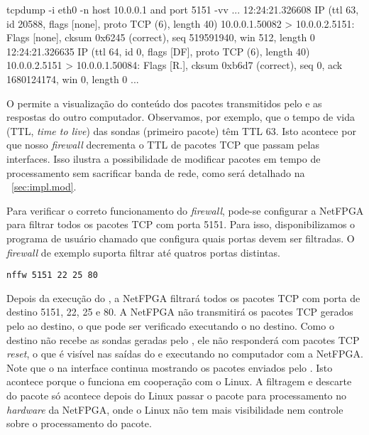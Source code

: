 \begin{verbnobox}[\small]
tcpdump -i eth0 -n host 10.0.0.1 and port 5151 -vv
...
12:24:21.326608 IP (ttl 63, id 20588, flags [none], proto TCP (6), length 40)
    10.0.0.1.50082 > 10.0.0.2.5151: Flags [none], cksum 0x6245 (correct),
                seq 519591940, win 512, length 0
12:24:21.326635 IP (ttl 64, id 0, flags [DF], proto TCP (6), length 40)
    10.0.0.2.5151 > 10.0.0.1.50084: Flags [R.], cksum 0xb6d7 (correct),
                seq 0, ack 1680124174, win 0, length 0
...
\end{verbnobox}

O  permite a visualização do conteúdo dos pacotes
transmitidos pelo  e as respostas do outro computador.
Observamos, por exemplo, que o tempo de vida (TTL, \emph{time to
live}) das sondas (primeiro pacote) têm TTL 63.  Isto acontece por
que nosso \emph{firewall} decrementa o TTL de pacotes TCP que passam
pelas interfaces. Isso ilustra a possibilidade de modificar pacotes
em tempo de processamento sem sacrificar banda de rede, como será
detalhado na \secstr~\ref{sec:impl.mod}.

Para verificar o correto funcionamento do \emph{firewall}, pode-se
configurar a NetFPGA para filtrar todos os pacotes TCP com porta
5151.  Para isso, disponibilizamos o programa de usuário chamado
 que configura quais portas devem ser filtradas. O
\emph{firewall} de exemplo suporta filtrar até quatros portas
distintas.

\begin{verbatim}
nffw 5151 22 25 80
\end{verbatim}

Depois da execução do , a NetFPGA filtrará todos os
pacotes TCP com porta de destino 5151, 22, 25 e 80.  A NetFPGA não
transmitirá os pacotes TCP gerados pelo  ao destino, o
que pode ser verificado executando o  no destino.  Como
o destino não recebe as sondas geradas pelo , ele não
responderá com pacotes TCP \emph{reset}, o que é visível nas saídas
do  e  executando no computador com a
NetFPGA.  Note que o  na interface  continua
mostrando os pacotes enviados pelo .  Isto acontece
porque o  funciona em cooperação com o Linux.  A
filtragem e descarte do pacote só acontece depois do Linux passar o
pacote para processamento no \emph{hardware} da NetFPGA, onde o
Linux não tem mais visibilidade nem controle sobre o processamento
do pacote.

